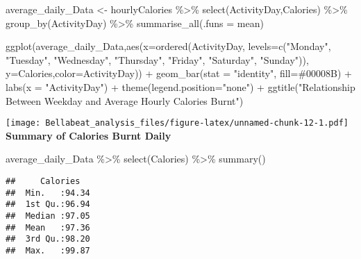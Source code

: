 \documentclass[
]{article}
\newenvironment{Shaded}{\begin{snugshade}}{\end{snugshade}}
\newcommand{\AttributeTok}[1]{\textcolor[rgb]{0.77,0.63,0.00}{#1}}
\newcommand{\FunctionTok}[1]{\textcolor[rgb]{0.00,0.00,0.00}{#1}}
\newcommand{\NormalTok}[1]{#1}
\newcommand{\OtherTok}[1]{\textcolor[rgb]{0.56,0.35,0.01}{#1}}
\newcommand{\SpecialCharTok}[1]{\textcolor[rgb]{0.00,0.00,0.00}{#1}}
\newcommand{\StringTok}[1]{\textcolor[rgb]{0.31,0.60,0.02}{#1}}
\begin{document}
\begin{Shaded}
\begin{Highlighting}[]
\NormalTok{average\_daily\_Data }\OtherTok{\textless{}{-}}\NormalTok{ hourlyCalories }\SpecialCharTok{\%\textgreater{}\%} 
  \FunctionTok{select}\NormalTok{(ActivityDay,Calories) }\SpecialCharTok{\%\textgreater{}\%} 
  \FunctionTok{group\_by}\NormalTok{(ActivityDay) }\SpecialCharTok{\%\textgreater{}\%} 
  \FunctionTok{summarise\_all}\NormalTok{(}\AttributeTok{.funs =}\NormalTok{ mean)}

\FunctionTok{ggplot}\NormalTok{(average\_daily\_Data,}\FunctionTok{aes}\NormalTok{(}\AttributeTok{x=}\FunctionTok{ordered}\NormalTok{(ActivityDay, }
                                        \AttributeTok{levels=}\FunctionTok{c}\NormalTok{(}\StringTok{"Monday"}\NormalTok{, }\StringTok{"Tuesday"}\NormalTok{, }\StringTok{"Wednesday"}\NormalTok{, }\StringTok{"Thursday"}\NormalTok{,}
                                                 \StringTok{"Friday"}\NormalTok{, }\StringTok{"Saturday"}\NormalTok{, }\StringTok{"Sunday"}\NormalTok{)), }
                              \AttributeTok{y=}\NormalTok{Calories,}\AttributeTok{color=}\NormalTok{ActivityDay)) }\SpecialCharTok{+} 
  \FunctionTok{geom\_bar}\NormalTok{(}\AttributeTok{stat =} \StringTok{"identity"}\NormalTok{, }\AttributeTok{fill=}\StringTok{\textquotesingle{}\#00008B\textquotesingle{}}\NormalTok{) }\SpecialCharTok{+} \FunctionTok{labs}\NormalTok{(}\AttributeTok{x =} \StringTok{"ActivityDay"}\NormalTok{) }\SpecialCharTok{+} 
  \FunctionTok{theme}\NormalTok{(}\AttributeTok{legend.position=}\StringTok{"none"}\NormalTok{) }\SpecialCharTok{+}
  \FunctionTok{ggtitle}\NormalTok{(}\StringTok{"Relationship Between Weekday and Average Hourly Calories Burnt"}\NormalTok{)}
\end{Highlighting}
\end{Shaded}

\texttt{[image: Bellabeat\_analysis\_files/figure-latex/unnamed-chunk-12-1.pdf]}\\
\textbf{Summary of Calories Burnt Daily}

\begin{Shaded}
\begin{Highlighting}[]
\NormalTok{average\_daily\_Data }\SpecialCharTok{\%\textgreater{}\%} 
  \FunctionTok{select}\NormalTok{(Calories) }\SpecialCharTok{\%\textgreater{}\%} 
  \FunctionTok{summary}\NormalTok{()}
\end{Highlighting}
\end{Shaded}

\begin{verbatim}
##     Calories    
##  Min.   :94.34  
##  1st Qu.:96.94  
##  Median :97.05  
##  Mean   :97.36  
##  3rd Qu.:98.20  
##  Max.   :99.87
\end{verbatim}
\end{document}
